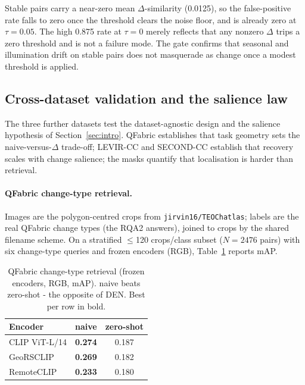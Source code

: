 \documentclass{article}
\begin{document}
Stable pairs carry a near-zero mean $\Delta$-similarity (0.0125), so the
false-positive rate falls to zero once the threshold clears the noise floor, and
is already zero at $\tau = 0.05$. The high 0.875 rate at $\tau = 0$ merely
reflects that any nonzero $\Delta$ trips a zero threshold and is not a failure
mode. The gate confirms that seasonal and illumination drift on stable pairs does
not masquerade as change once a modest threshold is applied.

\subsection{Cross-dataset validation and the salience law}
\label{sec:crossdataset}

The three further datasets test the dataset-agnostic design and the salience
hypothesis of Section~\ref{sec:intro}. QFabric establishes that task geometry
sets the naive-versus-$\Delta$ trade-off; LEVIR-CC and SECOND-CC establish that
recovery scales with change salience; the masks quantify that localisation is
harder than retrieval.

\paragraph{QFabric change-type retrieval.}
Images are the polygon-centred crops from \texttt{jirvin16/TEOChatlas}; labels are
the real QFabric change types (the RQA2 answers), joined to crops by the shared
filename scheme. On a stratified $\leq$120 crops/class subset ($N = 2476$ pairs)
with six change-type queries and frozen encoders (RGB),
Table~\ref{tab:qfabric} reports mAP.

\begin{table}[H]
    \centering
    \caption{QFabric change-type retrieval (frozen encoders, RGB, mAP). naive
    beats zero-shot - the opposite of DEN. Best per row in bold.}
    \label{tab:qfabric}
    \begin{tabular}{lcc}
        \toprule
        \textbf{Encoder} & \textbf{naive} & \textbf{zero-shot} \\
        \midrule
        CLIP ViT-L/14 & \textbf{0.274} & 0.187 \\
        GeoRSCLIP     & \textbf{0.269} & 0.182 \\
        RemoteCLIP    & \textbf{0.233} & 0.180 \\
        \bottomrule
    \end{tabular}
\end{table}
\end{document}
